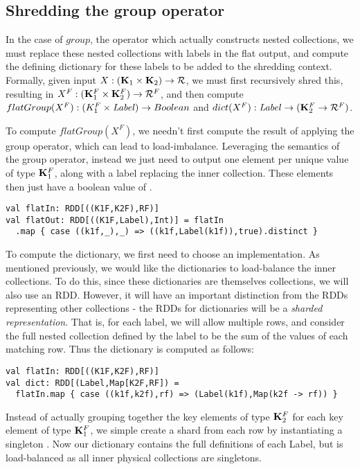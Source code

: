\subsection{Shredding the group operator}
In the case of $group$, the operator which actually constructs nested collections, we must replace these nested collections with labels in the flat output, and compute the defining dictionary for these labels to be added to the shredding context. Formally, given input $X: (\mathbf{K}_1 \times \mathbf{K}_2) \rightarrow \mathcal{R}$, we must first recursively shred this, resulting in $X^F: (\mathbf{K}_1^F \times \mathbf{K}_2^F) \rightarrow \mathcal{R}^F$, and then compute $flatGroup(X^F): (K_1^F \times \textrm{\textit{Label}}) \rightarrow Boolean$ and $dict(X^F): \textrm{\textit{Label}} \rightarrow (\mathbf{K}_2^F \rightarrow \mathcal{R}^F)$.

To compute $flatGroup(X^F)$, we needn't first compute the result of applying the group operator, which can lead to load-imbalance. Leveraging the semantics of the group operator, instead we just need to output one element per unique value of type $\mathbf{K}_1^F$, along with a label replacing the inner collection. These elements then just have a boolean value of .
\vs\begin{lstlisting}
val flatIn: RDD[((K1F,K2F),RF)]
val flatOut: RDD[((K1F,Label),Int)] = flatIn
  .map { case ((k1f,_),_) => ((k1f,Label(k1f)),true).distinct }
\end{lstlisting}\vs

To compute the dictionary, we first need to choose an implementation. As mentioned previously, we would like the dictionaries to load-balance the inner collections. To do this, since these dictionaries are themselves collections, we will also use an RDD. However, it will have an important distinction from the RDDs representing other collections - the RDDs for dictionaries will be a \textit{sharded representation}. That is, for each label, we will allow multiple rows, and consider the full nested collection defined by the label to be the sum of the values of each matching row. Thus the dictionary is computed as follows:
\vs\begin{lstlisting}
val flatIn: RDD[((K1F,K2F),RF)]
val dict: RDD[(Label,Map[K2F,RF]) =
  flatIn.map { case ((k1f,k2f),rf) => (Label(k1f),Map(k2f -> rf)) }
\end{lstlisting}\vs
Instead of actually grouping together the key elements of type $\mathbf{K}_2^F$ for each key element of type $\mathbf{K}_1^F$, we simple create a shard from each row by instantiating a singleton . Now our dictionary contains the full definitions of each Label, but is load-balanced as all inner physical collections are singletons.

